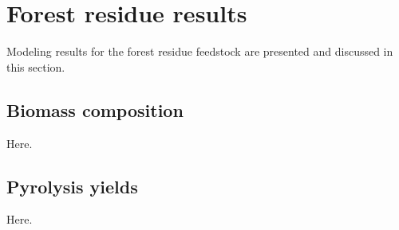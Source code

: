 
\section{Forest residue results}

Modeling results for the forest residue feedstock are presented and discussed in this section.

\subsection{Biomass composition}

Here.

\subsection{Pyrolysis yields}

Here.
